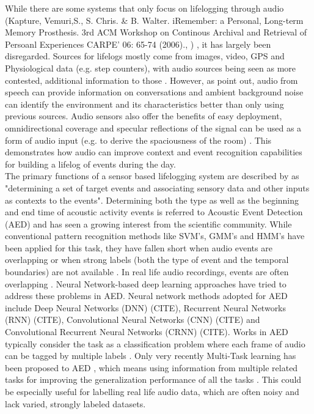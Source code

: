 While there are some systems that only focus on lifelogging through audio (Kapture, Vemuri,S., S. Chris. \& B. Walter. iRemember: a Personal, Long-term Memory Prosthesis. 3rd ACM Workshop on Continous Archival and Retrieval of Persoanl Experiences CARPE' 06: 65-74 (2006)., ) \cite{shah2012lifelogging}, it has largely been disregarded. Sources for lifelogs mostly come from images, video, GPS and Physiological data (e.g. step counters), with audio sources being seen as more contested, additional information to those \cite{harvey2016remembering}. However, as \citet{yamano2009browsing} point out, audio from speech can provide information on conversations and ambient background noise can identify the environment and its characteristics better than only using previous sources. Audio sensors also offer the benefits of easy deployment, omnidirectional coverage and specular reflections of the signal can be used as a form of audio input (e.g. to derive the spaciousness of the room) \cite{chandrakala2019environmental}. This demonstrates how audio can improve context and event recognition capabilities for building a lifelog of events during the day. \\

The primary functions of a sensor based lifelogging system are described by \citet{ali2019insight} as "determining a set of target events and associating sensory data and other inputs as contexts to the events". Determining both the type as well as the beginning and end time of acoustic activity events is referred to Acoustic Event Detection (AED) and has seen a growing interest from the scientific community. While conventional pattern recognition methods like SVM's, GMM's and HMM's have been applied for this task, they have fallen short when audio events are overlapping or when strong labels (both the type of event and the temporal boundaries) are not available \cite{xia2019survey}. In real life audio recordings, events are often overlapping . Neural Network-based deep learning approaches have tried to address these problems in AED. Neural network methods adopted for AED include Deep Neural Networks (DNN) (CITE), Recurrent Neural Networks (RNN) (CITE), Convolutional Neural Networks (CNN) (CITE) and Convolutional Recurrent Neural Networks (CRNN) (CITE). Works in AED typically consider the task as a classification problem where each frame of audio can be tagged by multiple labels \cite{xia2019multi}. Only very recently Multi-Task learning has been proposed to AED \cite{xia2019multi}, which means using information from multiple related tasks for improving the generalization performance of all the tasks \cite{zhang2017survey}. This could be especially useful for labelling real life audio data, which are often noisy and lack varied, strongly labeled datasets. \\

